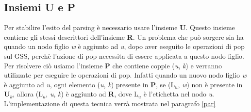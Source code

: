 \subsection{Insiemi U e P}
Per stabilire l'esito del parsing è necessario usare l'insieme \textbf{U}. Questo insieme contiene gli stessi descrittori dell'insieme \textbf{R}. Un problema \cite{pubblicazione: scott} che può sorgere sia ha quando un nodo figlio \textit{w} è aggiunto ad \textit{u}, dopo aver eseguito le operazioni di pop sul GSS, perchè l'azione di pop necessita di essere applicata a questo nodo figlio. Per risolvere ciò usiamo l'insieme \textbf{P} che contiene coppie (\textit{u}, \textit{k}) e verranno utilizzate per eseguire le operazioni di pop. Infatti quando un nuovo nodo figlio \textit{w} è aggiunto ad \textit{u}, ogni elemento (\textit{u}, \textit{k}) presente in \textbf{P}, se (L$_u$, \textit{w}) non è presente in \textbf{U$_k$}, allora (L$_u$, \textit{u}, \textit{k}) è aggiunto ad \textbf{R}, dove L$_u$ è l'etichetta nel nodo \textit{u}. L'implementazione di questa tecnica verrà mostrata nel paragrafo \ref{par}  
